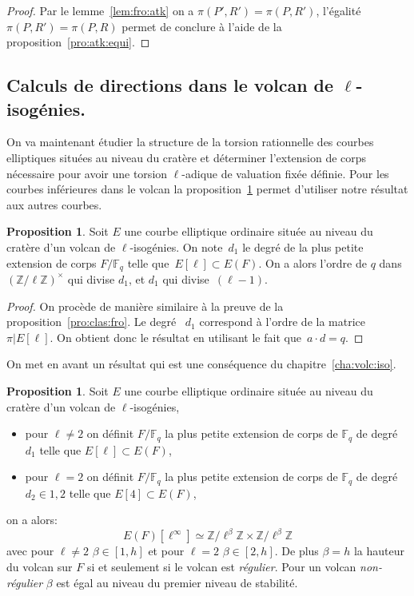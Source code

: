 \documentclass[10pt,a4paper]{book}
\theoremstyle{plain}
\theoremstyle{definition}
\theoremstyle{definition}
\theoremstyle{definition}
\newtheorem{prop}[thm]{Proposition}
\theoremstyle{definition}
\theoremstyle{remark}
\theoremstyle{remark}
\theoremstyle{definition}
\begin{document}
\begin{proof}
Par le lemme~\ref{lem:fro:atk} on a $\pi(P',R')=\pi(P,R')$, l'égalité 
$\pi(P,R')=\pi(P,R)$ permet de conclure à l'aide de la 
proposition~\ref{pro:atk:equi}.
\end{proof}

\subsection{Calculs de directions dans le volcan de $\ell$-isogénies.}

On va maintenant étudier la structure de la torsion rationnelle des courbes 
elliptiques situées au niveau du cratère et déterminer l'extension de corps 
nécessaire pour avoir une torsion $\ell$-adique de valuation fixée définie.
Pour les courbes inférieures dans le volcan la 
proposition~\ref{pro:atk:d1} permet d'utiliser notre résultat aux autres
courbes. 


\begin{prop}
Soit $E$ une courbe elliptique ordinaire située au niveau du cratère d'un 
volcan de $\ell$-isogénies. On note~$d_1$ le degré de la plus 
petite extension de corps $F/\mathbb{F}_q$ telle que~$E[\ell]\subset E(F)$. 
On  a alors l'ordre de $q$ dans $(\mathbb{Z}/ \ell \mathbb{Z})^\times$ qui divise $d_1$,
et $d_1$ qui divise~$(\ell-1)$.
\end{prop}

\begin{proof}
On procède de manière similaire à la preuve de la proposition~\ref{pro:clas:fro}.
Le degré ~$d_1$ correspond à l'ordre de la matrice~$\pi|E[\ell]$.
On obtient donc le résultat en utilisant le fait que~$a \cdot d = q$. 
\end{proof}

On met en avant un résultat qui est une conséquence du 
chapitre~\ref{cha:volc:iso}. 

\begin{prop}
\label{pro:atk:d1}
Soit $E$ une courbe elliptique ordinaire située au niveau du cratère d'un 
volcan de $\ell$-isogénies,
\begin{itemize}
\item pour $\ell \neq 2$ on définit $F/\mathbb{F}_q$ la 
plus petite extension de corps de $\mathbb{F}_q$ de degré $d_1$ telle que 
$E[\ell] \subset E(F)$,
\item pour $\ell=2$ on définit $F/\mathbb{F}_q$ la 
plus petite extension de corps de $\mathbb{F}_q$ de degré $d_2 \in {1,2}$ telle
que $E[4] \subset E(F)$,
\end{itemize}
on a alors:
\[
E(F)[\ell^{\infty}] \simeq \mathbb{Z}/ \ell^{\beta} \mathbb{Z} \times \mathbb{Z}/ \ell^{\beta} \mathbb{Z} 
\]
avec pour $\ell \neq 2$ $\beta \in [1,h]$ et pour $\ell=2$ $\beta \in [2,h]$. De 
plus $\beta=h$ la hauteur du volcan sur $F$ si et seulement si le volcan est \emph{régulier}.
Pour un volcan \emph{non-régulier} $\beta$ est égal au niveau du premier niveau de stabilité. 
\end{prop}
\end{document}
